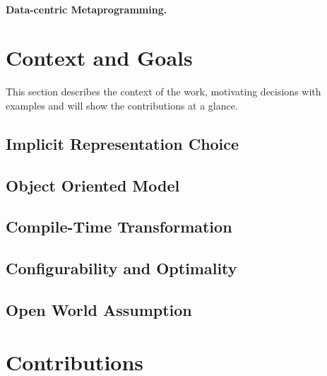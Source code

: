 


\paragraph*{Data-centric Metaprogramming.}


\section{Context and Goals}

This section describes the context of the work, motivating decisions with examples and will show the contributions at a glance.

\subsection{Implicit Representation Choice}


\subsection{Object Oriented Model}





\subsection{Compile-Time Transformation}

\subsection{Configurability and Optimality}

\subsection{Open World Assumption}


\section{Contributions}
